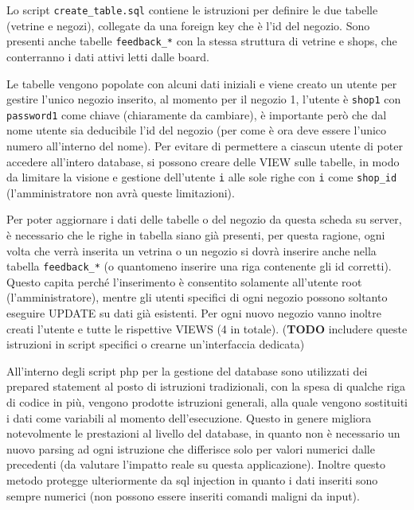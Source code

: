 Lo script \texttt{create\_table.sql} contiene le istruzioni per definire le due tabelle (vetrine e negozi), collegate da una foreign key che \`e l'id del negozio. Sono presenti anche tabelle \texttt{feedback\_*} con la stessa struttura di vetrine e shops, che conterranno i dati attivi letti dalle board.

Le tabelle vengono popolate con alcuni dati iniziali e viene creato un utente per gestire l'unico negozio inserito, al momento per il negozio 1, l'utente \`e \texttt{shop1} con \texttt{password1} come chiave (chiaramente da cambiare), \`e importante per\`o che dal nome utente sia deducibile l'id del negozio (per come \`e ora deve essere l'unico numero all'interno del nome). Per evitare di permettere a ciascun utente di poter accedere all'intero database, si possono creare delle VIEW sulle tabelle, in modo da limitare la visione e gestione dell'utente \texttt{i} alle sole righe con \texttt{i} come \texttt{shop\_id} (l'amministratore non avr\`a queste limitazioni).

Per poter aggiornare i dati delle tabelle o del negozio da questa scheda su server, \`e necessario che le righe in tabella siano gi\`a presenti, per questa ragione, ogni volta che verr\`a inserita un vetrina o un negozio si dovr\`a inserire anche nella tabella \texttt{feedback\_*} (o quantomeno inserire una riga contenente gli id corretti). Questo capita perch\'e l'inserimento \`e consentito solamente all'utente root (l'amministratore), mentre gli utenti specifici di ogni negozio possono soltanto eseguire UPDATE su dati gi\`a esistenti. Per ogni nuovo negozio vanno inoltre creati l'utente e tutte le rispettive VIEWS (4 in totale). (\textbf{TODO} includere queste istruzioni in script specifici o crearne un'interfaccia dedicata) 

All'interno degli script php per la gestione del database sono utilizzati dei prepared statement al posto di istruzioni tradizionali, con la spesa di qualche riga di codice in pi\`u, vengono prodotte istruzioni generali, alla quale vengono sostituiti i dati come variabili al momento dell'esecuzione. Questo in genere migliora notevolmente le prestazioni al livello del database, in quanto non \`e necessario un nuovo parsing ad ogni istruzione che differisce solo per valori numerici dalle precedenti (da valutare l'impatto reale su questa applicazione). Inoltre questo metodo protegge ulteriormente da sql injection in quanto i dati inseriti sono sempre numerici (non possono essere inseriti comandi maligni da input).

